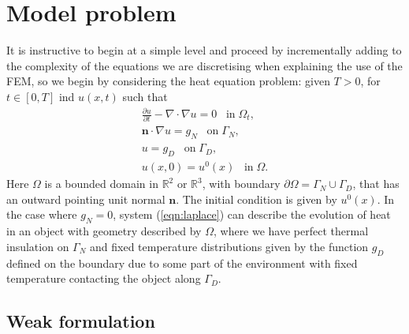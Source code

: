 \section{Model problem}
It is instructive to begin at a simple level and proceed by incrementally adding to the
complexity of the equations we are discretising when explaining the use of the FEM, so
we begin by considering the heat equation problem: given $T>0$, for $t \in[0,T]$ ind $u(x,t)$ such that
\begin{subequations}
\begin{align}
\label{eqn:heat_strong}
\frac{\partial u}{\partial t} - \nabla \cdot \nabla u = 0\;\;\; \mbox{in} \; \Omega_{t},\\
\boldsymbol{n} \cdot \nabla u = {g}_{N}   \;\;\; \mbox{on}\; \Gamma_{N},
\\
\label{eqn:heat_dirichlet}
 u = {g}_{D}   \;\;\; \mbox{on}\; \Gamma_{D},
\\
 u(x,0) = u^{0}(x)   \;\;\; \mbox{in}\; \Omega.
\end{align}
\label{eqn:laplace}
\end{subequations}
Here $\Omega$ is a bounded domain in $\mathbb{R}^{2}$ or $\mathbb{R}^{3}$, with boundary $\partial\Omega = \Gamma_{N}  \cup \Gamma_{D} $, that has an outward pointing unit normal $\boldsymbol{n}$. The initial condition is given by $u^{0}(x)$. In the case where ${g}_{N}= 0$, system (\ref{eqn:laplace}) can describe the evolution of heat in an
object with geometry described by $\Omega$, where we have perfect thermal insulation on $\Gamma_{N}$ and fixed temperature distributions given by the function ${g}_{D}$ defined on the boundary due to some part of the environment with fixed temperature contacting the object along $\Gamma_{D}$.

\subsection{Weak formulation}

